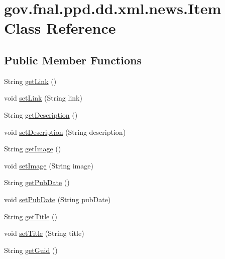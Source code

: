 \hypertarget{classgov_1_1fnal_1_1ppd_1_1dd_1_1xml_1_1news_1_1Item}{\section{gov.\-fnal.\-ppd.\-dd.\-xml.\-news.\-Item Class Reference}
\label{classgov_1_1fnal_1_1ppd_1_1dd_1_1xml_1_1news_1_1Item}
}
\subsection*{Public Member Functions}
\begin{DoxyCompactItemize}
\item 
String \hyperlink{classgov_1_1fnal_1_1ppd_1_1dd_1_1xml_1_1news_1_1Item_a2d9ffa5391957f0476919403fbb7bb82}{get\-Link} ()
\item 
void \hyperlink{classgov_1_1fnal_1_1ppd_1_1dd_1_1xml_1_1news_1_1Item_a0b038533b517e7d2c1dbffc9844b9539}{set\-Link} (String link)
\item 
String \hyperlink{classgov_1_1fnal_1_1ppd_1_1dd_1_1xml_1_1news_1_1Item_a108f0de62782b0e2e6aa52bdb2b46cba}{get\-Description} ()
\item 
void \hyperlink{classgov_1_1fnal_1_1ppd_1_1dd_1_1xml_1_1news_1_1Item_ad3e40189b7a74762f593c3601f17b7fa}{set\-Description} (String description)
\item 
String \hyperlink{classgov_1_1fnal_1_1ppd_1_1dd_1_1xml_1_1news_1_1Item_a2c6863ffcdf6f5d166ba86daea20d852}{get\-Image} ()
\item 
void \hyperlink{classgov_1_1fnal_1_1ppd_1_1dd_1_1xml_1_1news_1_1Item_a0139f388b1cb37202f61f4215ae0f43f}{set\-Image} (String image)
\item 
String \hyperlink{classgov_1_1fnal_1_1ppd_1_1dd_1_1xml_1_1news_1_1Item_a83c0b6fc5635e3694cc318b032ca4120}{get\-Pub\-Date} ()
\item 
void \hyperlink{classgov_1_1fnal_1_1ppd_1_1dd_1_1xml_1_1news_1_1Item_ad4f23b5cb23b6070e58691ce2aa68513}{set\-Pub\-Date} (String pub\-Date)
\item 
String \hyperlink{classgov_1_1fnal_1_1ppd_1_1dd_1_1xml_1_1news_1_1Item_a24e062355b58ab30f193068b486bed34}{get\-Title} ()
\item 
void \hyperlink{classgov_1_1fnal_1_1ppd_1_1dd_1_1xml_1_1news_1_1Item_a375758ad14a03263c650bb472ac72f3f}{set\-Title} (String title)
\item 
String \hyperlink{classgov_1_1fnal_1_1ppd_1_1dd_1_1xml_1_1news_1_1Item_a42ff2dd5329e99685c4f491d0135687f}{get\-Guid} ()

\end{DoxyCompactItemize}
